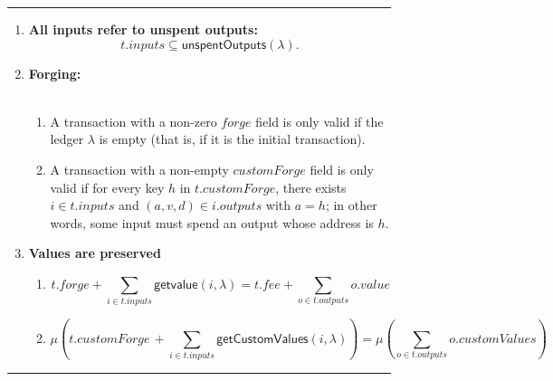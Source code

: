 \documentclass[a4paper]{article}
\newcommand{\s}{\textsf}  %
\newcommand\rfskip{7pt}
\newenvironment{ruledfigure}[1]{\begin{figure}[#1]\hrule\vspace{\rfskip}}{\vspace{\rfskip}\hrule\end{figure}}
\newcommand{\mi}[1]{\ensuremath{\mathit{#1}}}
\newcommand{\inputs}{\mi{inputs}}
\newcommand{\outputs}{\mi{outputs}}
\newcommand{\forge}{\mi{forge}}
\newcommand{\fee}{\mi{fee}}
\newcommand{\val}{\mi{value}}  %
\newcommand{\customvals}{\mi{customValues}}
\newcommand{\customforge}{\mi{customForge}}
\newcommand{\getvalue}{\msf{getvalue}}
\newcommand{\msf}[1]{\ensuremath{\mathsf{#1}}}
\newcommand{\unspent}{\msf{unspentOutputs}}
\begin{document}
\begin{ruledfigure}{H}
  \begin{enumerate}
    \item \label{rule:all-inputs-refer-to-unspent-outputs-2} \textbf{All
      inputs refer to unspent outputs:}
      \[
        t.\inputs \subseteq \unspent(\lambda).
      \]
    \item\textbf{Forging:}\\\\
      \begin{minipage}{0.85\textwidth}
          \begin{enumerate}
          \item
              A transaction with a non-zero \forge{} field is only
            valid if the ledger $\lambda$ is empty
            (that is, if it is the initial
            transaction). 
          \item \label{rule:custom-forge}
            A transaction with a non-empty \customforge{} field is
            only valid if for every key $h$ in $t.\customforge$, there
            exists $i \in t.\inputs$ and $(a,v,d) \in i.\outputs$ with
            $a =h$; in other words, some input must spend an output
            whose address is $h$.
          \end{enumerate}
          \end{minipage}
    \item \textbf{Values are preserved}\\
      \begin{minipage}{0.85\textwidth}
          \begin{enumerate}
          \item\label{rule:native-value-is-preserved-2}
            \[
            t.\forge + \sum_{i \in t.\inputs} \getvalue(i, \lambda) = t.\fee + \sum_{o \in t.\outputs} o.\val
            \]

          \item\label{rule:custom-values-are-preserved-2}
            \[
              \mu\left(t.\customforge\, + \sum_{i \in t.\inputs} \s{getCustomValues}(i, \lambda)\right) =
              \mu\left(\sum_{o \in t.\outputs} o.\customvals\right)
            \]
          \end{enumerate}
          

\end{minipage}
\end{enumerate}
\end{ruledfigure}
\end{document}
